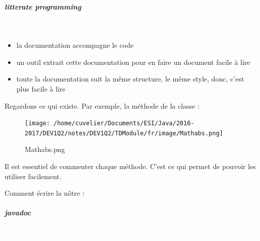 \documentclass[11pt,a4paper]{article}
\begin{document}
            \par
        
			
		\subparagraph{litterate programming} 
		
					\textcolor{white}{.} \par
				
					\begin{itemize}
				
			\item la documentation accompagne le code
			\item un outil extrait cette documentation pour en faire un document facile \`a lire
			\item toute la documentation suit la m\^eme structure, le m\^eme style, donc, c'est plus facile \`a lire
					\end{itemize}
				
            \par
        
		    Regardons ce qui existe. 
		    Par exemple, la m\'ethode \verb@abs@ de la classe \verb@Math@ :
		  
            \par
        \begin{figure}[hbt]
				    \begin{center}
					\texttt{[image: /home/cuvelier/Documents/ESI/Java/2016-2017/DEV1Q2/notes/DEV1Q2/TDModule/fr/image/Mathabs.png]}
						\end{center}
                
                    \caption[Mathabs.png]{Mathabs.png}
                \end{figure}
                    
            \par
        
		    Il est essentiel de commenter chaque m\'ethode. C'est ce qui permet de pouvoir les utiliser facilement.
		  
            \par
        
		    Comment \'ecrire la n\^otre :
		  
            \par
        
			
		\subparagraph{javadoc} 
		
					\textcolor{white}{.} \par
				
\end{document}
